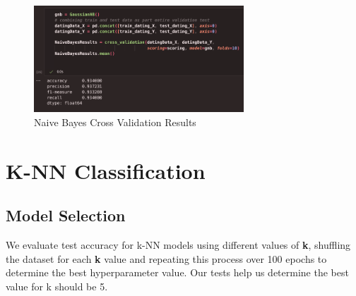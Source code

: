 \documentclass{article}
\begin{document}
    \begin{figure}[H]
        \centering
        \includegraphics[width=0.7\textwidth, height=0.2\textheight]{NB_results.png}
        \caption{\small{Naive Bayes Cross Validation Results}}
    \end{figure}

\section*{K-NN Classification}

    \subsection*{Model Selection}

    We evaluate test accuracy for k-NN models using different values of \textbf{k}, shuffling the dataset for each
    \textbf{k} value and repeating this process over 100 epochs to determine the best hyperparameter value. Our
    tests help us determine the best value for k should be 5.
    
\end{document}
